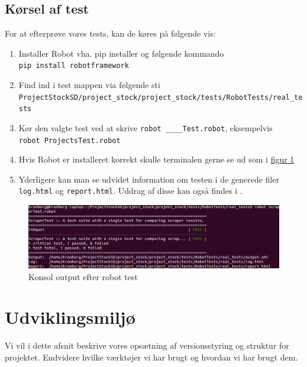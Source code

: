 \documentclass[12pt]{article}
\begin{document}
\subsection{Kørsel af test}
For at efterprøve vores tests, kan de køres på følgende vis:
\begin{enumerate}
  \item Installer Robot vha. pip installer og følgende kommando\\
  \texttt{pip install robotframework}
  \item Find ind i test mappen via følgende sti \\ \texttt{ProjectStockSD/project\_stock/project\_stock/tests/RobotTests/real\_tests} 
  \item Kør den valgte test ved at skrive \texttt{robot \_\_\_\_Test.robot}, eksempelvis \\
  \texttt{robot ProjectsTest.robot}
  \item Hvis Robot er installeret korrekt skulle terminalen gerne se ud som i \hyperref[fig:console_output]{figur \ref*{fig:console_output}}
  \item Yderligere kan man se udvidet information om testen i de generede filer \texttt{log.html} og \texttt{report.html}. Uddrag af disse kan også findes i .
\end{enumerate}
\begin{figure}[H]
    \centering
    \includegraphics[scale=0.5]{test.png}
    \caption{Konsol output efter robot test}
    \label{fig:console_output}
\end{figure}

\section{Udviklingsmiljø}
\label{sec:udvikling}
Vi vil i dette afsnit beskrive vores opsætning af versionsstyring og struktur for projektet. Endvidere hvilke værktøjer vi har brugt og hvordan vi har brugt dem.
\end{document}
